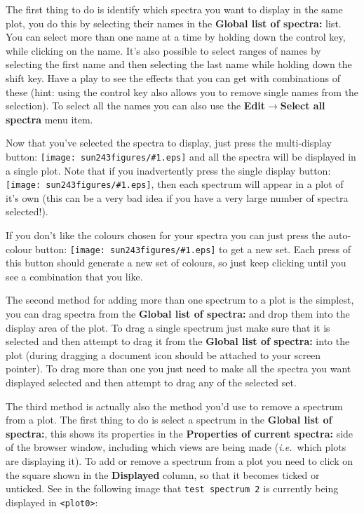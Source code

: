 \documentclass[twoside,11pt]{article}
\newcommand{\htmladdimg}[1]{}
\newcommand{\latexhtml}[2]{#1}
\renewcommand{\_}{\texttt{\symbol{95}}}
\newcommand{\inline}[1]
        {\latexhtml{\texttt{[image: sun243\_figures/\#1.eps]}}
        {\htmladdimg[align=center]{#1.gif}}}
\newcommand{\submenuitem}[2]{\latexhtml{\textbf{#1$\rightarrow$#2}}{\textbf{#1->#2}}}
\newcommand{\labelitem}[1]{\textbf{#1}}
\newcommand{\hitext}[1]{\texttt{#1}}
\newcommand{\ie}{\textit{i.e.}}
\begin{document}
\label{selecting_spectra}
The first thing to do is identify which spectra you want to display in
the same plot, you do this by selecting their names in the
\labelitem{Global list of spectra:} list. You can select more than one
name at a time by holding down the control key, while clicking on the
name. It's also possible to select ranges of names by selecting the
first name and then selecting the last name while holding down the
shift key. Have a play to see the effects that you can get with
combinations of these (hint: using the control key also allows you to
remove single names from the selection). To select all the names you
can also use the \submenuitem{Edit}{Select all spectra} menu item.

Now that you've selected the spectra to display, just press the
multi-display button: \inline{multidisplay} and all the spectra
will be displayed in a single plot. Note that if you inadvertently
press the single display button: \inline{display}, then each
spectrum will appear in a plot of it's own (this can be a very bad
idea if you have a very large number of spectra selected!).

If you don't like the colours chosen for your spectra you can just press the
auto-colour button: \inline{rainbow} to get a new set. Each press of this
button should generate a new set of colours, so just keep clicking until you
see a combination that you like.

The second method for adding more than one spectrum to a plot is the
simplest, you can drag spectra from the \labelitem{Global list of
spectra:} and drop them into the display area of the plot. To drag a
single spectrum just make sure that it is selected and then attempt to
drag it from the \labelitem{Global list of spectra:} into the plot
(during dragging a document icon should be attached to your screen
pointer). To drag more than one you just need to make all the spectra
you want displayed selected and then attempt to drag any of the
selected set.

The third method is actually also the method you'd use to remove a
spectrum from a plot. The first thing to do is select a spectrum in the
\labelitem{Global list of spectra:},
this shows its properties in the
\labelitem{Properties of current spectra:}
side of the browser window, including which views
are being made (\ie\ which plots are displaying it). To add or remove
a spectrum from a plot you need to click on the square shown in the
\labelitem{Displayed} column, so that it becomes ticked or unticked. See
in the following image that \hitext{test spectrum 2} is currently
being displayed in \hitext{<plot0>}:
\end{document}
